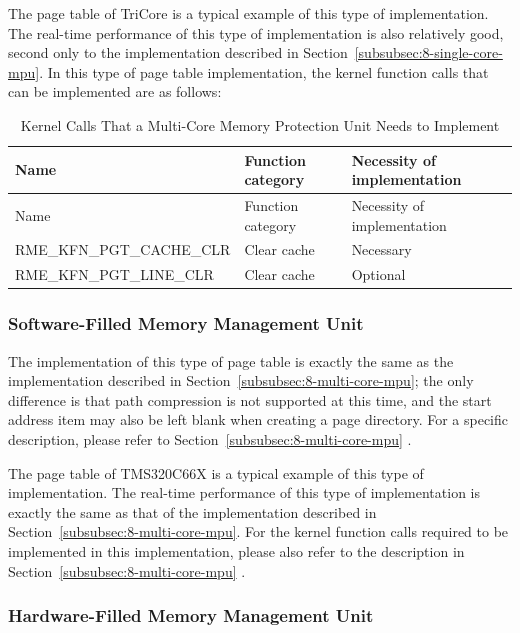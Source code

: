 The page table of TriCore is a typical example of this type of implementation. The real-time performance of this type of implementation is also relatively good, second only to the implementation described in Section~\ref{subsubsec:8-single-core-mpu}. In this type of page table implementation, the kernel function calls that can be implemented are as follows:

\begin{xltabular}{\textwidth}{@{}>{\hsize\raggedright\arraybackslash}X>{\hsize\raggedright\arraybackslash}X>{\hsize\raggedright\arraybackslash}X@{}}
\caption{Kernel Calls That a Multi-Core Memory Protection Unit Needs to Implement}\label{tab:8-3-kernel-calls-required-by-multi-core-mpu}\\
\toprule
Name & Function category & Necessity of implementation\tabularnewline
\endfirsthead
\toprule
Name & Function category & Necessity of implementation\tabularnewline
\midrule
\endhead
\bottomrule
\endlastfoot
RME\_KFN\_PGT\_CACHE\_CLR & Clear cache & Necessary\tabularnewline
RME\_KFN\_PGT\_LINE\_CLR & Clear cache & Optional\tabularnewline
\end{xltabular}
\nopagebreak[4]

\subsubsection{Software-Filled Memory Management Unit}\label{subsubsec:8-software-filled-mmu}

The implementation of this type of page table is exactly the same as the implementation described in Section~\ref{subsubsec:8-multi-core-mpu}; the only difference is that path compression is not supported at this time, and the start address item may also be left blank when creating a page directory. For a specific description, please refer to Section~\ref{subsubsec:8-multi-core-mpu}
.

The page table of TMS320C66X is a typical example of this type of implementation. The real-time performance of this type of implementation is exactly the same as that of the implementation described in Section~\ref{subsubsec:8-multi-core-mpu}. For the kernel function calls required to be implemented in this implementation, please also refer to the description in Section~\ref{subsubsec:8-multi-core-mpu}
.

\subsubsection{Hardware-Filled Memory Management Unit}\label{subsubsec:8-hardware-filled-mmu}

